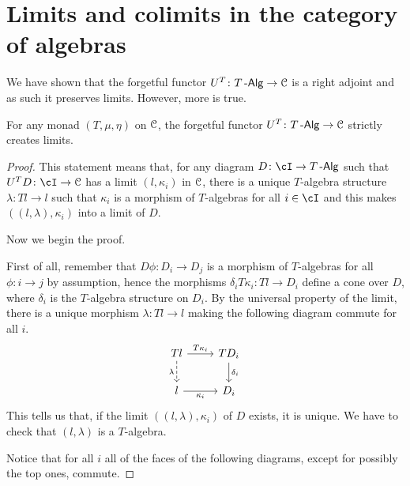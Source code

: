 \documentclass[a4paper,11pt,oneside,openany]{scrbook}
\begin{document}
\section{Limits and colimits in the category of algebras}

We have shown that the forgetful functor $U^T\colon T\operatorname{-\mathsf{Alg}}\rightarrow\operatorname{\mathcal{C}}$ is a right adjoint and as such it preserves limits. However, more is true.

\begin{prop}\label{create lims}
	For any monad $(T,\mu,\eta)$ on $\operatorname{\mathcal{C}}$, the forgetful functor $U^T\colon T\operatorname{-\mathsf{Alg}}\rightarrow\operatorname{\mathcal{C}}$ strictly creates limits.
\end{prop}

\begin{proof}
	This statement means that, for any diagram $D\colon\cI\rightarrow T\Alg$ such that $U^TD\colon\cI\rightarrow\C$ has a limit $(l,\kappa_i)$ in $\operatorname{\mathcal{C}}$, there is a unique $T$-algebra structure $\lambda\colon Tl\rightarrow l$ such that $\kappa_i$ is a morphism of $T$-algebras for all $i\in\cI$ and this makes $((l,\lambda),\kappa_i)$ into a limit of $D$.

	Now we begin the proof.

	First of all, remember that $D\phi\colon D_i\rightarrow D_j$ is a morphism of $T$-algebras for all $\phi\colon i\rightarrow j$ by assumption, hence the morphisms $\delta_i T\kappa_i\colon Tl\rightarrow D_i$ define a cone over $D$, where $\delta_i$ is the $T$-algebra structure on $D_i$. By the universal property of the limit, there is a unique morphism $\lambda\colon Tl\rightarrow l$ making the following diagram commute for all $i$.
	\[
		\begin{tikzcd}
			Tl\ar[d, dashed, "\lambda"'] \ar[r, "T\kappa_i"]
			& TD_i\ar[d, "\delta_i"]\\
			l\ar[r, "\kappa_i"']
			& D_i
		\end{tikzcd}
	\]
	This tells us that, if the limit $((l,\lambda),\kappa_i)$ of $D$ exists, it is unique. We have to check that $(l,\lambda)$ is a $T$-algebra.

	Notice that for all $i$ all of the faces of the following diagrams, except for possibly the top ones, commute.


\end{proof}
\end{document}
